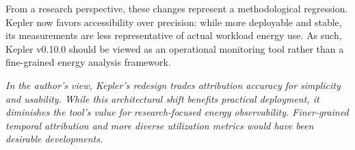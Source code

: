 From a research perspective, these changes represent a methodological regression. Kepler now favors accessibility over precision: while more deployable and stable, its measurements are less representative of actual workload energy use. As such, Kepler v0.10.0 should be viewed as an operational monitoring tool rather than a fine-grained energy analysis framework.

\textit{In the author's view, Kepler's redesign trades attribution accuracy for simplicity and usability. While this architectural shift benefits practical deployment, it diminishes the tool's value for research-focused energy observability. Finer-grained temporal attribution and more diverse utilization metrics would have been desirable developments.}

